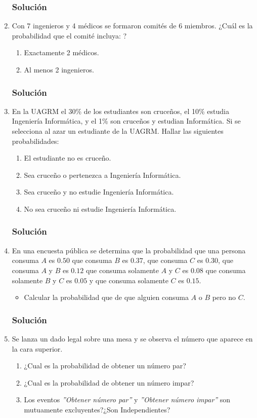 \begin{enumerate}
\subsubsection{Solución}
\item Con 7 ingenieros y 4 médicos se formaron comités de 6 miembros. ¿Cuál es la probabilidad que el comité incluya: ?
\begin{enumerate}
\item Exactamente 2 médicos.
\item Al menos 2 ingenieros.
\end{enumerate}
\subsubsection{Solución}
\item En la UAGRM el 30\% de los estudiantes son cruceños, el 10\% estudia Ingeniería Informática, y el 1\% son cruceños y estudian Informática. Si se selecciona al azar un estudiante de la UAGRM. Hallar las siguientes probabilidades:
\begin{enumerate}
\item El estudiante no es cruceño.
\item Sea cruceño o pertenezca a Ingeniería Informática.
\item Sea cruceño y no estudie Ingeniería Informática.
\item No sea cruceño ni estudie Ingeniería Informática.
\end{enumerate}
\subsubsection{Solución}
\item En una encuesta pública se determina que la probabilidad que una persona consuma $A$ es $0.50$ que consuma $B$ es $0.37$, que consuma $C$ es $0.30$, que consuma $A$ y $B$ es $0.12$ que consuma solamente $A$ y $C$ es $0.08$ que consuma solamente $B$ y $C$ es $0.05$ y que consuma solamente $C$ es $0.15$.
\begin{itemize}
\item Calcular la probabilidad que de que alguien consuma $A$ o $B$ pero no $C$.
\end{itemize}
\subsubsection{Solución}
\item Se lanza un dado legal sobre una mesa y se observa el número que aparece en la cara superior.
\begin{enumerate}
\item ¿Cual es la probabilidad de obtener un número par?
\item ¿Cual es la probabilidad de obtener un número impar?
\item Los eventos \textit{''Obtener número par''} y \textit{''Obtener número impar''} son mutuamente excluyentes?¿Son Independientes?
 

\end{enumerate}
\end{enumerate}
